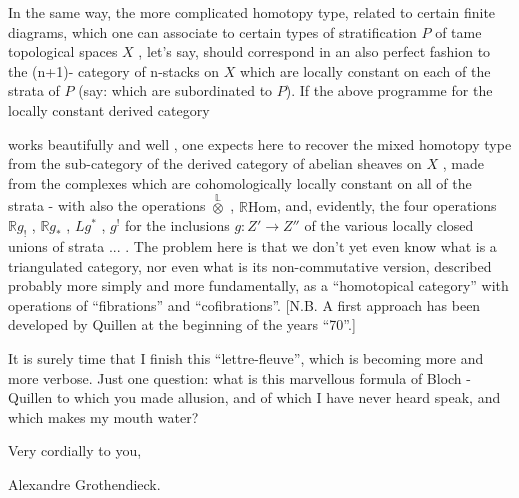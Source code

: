 \documentclass[11pt]{article}
\newcommand{\scanpage}[1]{\par\bigskip\noindent{\small\sffamily[scan #1]}\par}
\newcommand{\mspage}[1]{{\small\sffamily[p.\,#1]}}
\newcommand{\hand}[1]{\textcolor{blue}{#1}}
\begin{document}
In the same way, the more complicated homotopy type, related
to certain finite diagrams, which one can associate to certain
types of stratification $P$ of tame topological spaces $X$ , let's
say, should correspond in an also perfect fashion to the (n+1)-%
category of n-stacks on $X$ which are locally constant on each
of the strata of $P$ (say: which are subordinated to $P$).
If the above programme for the locally constant derived category

\mspage{\hand{143}}

\clearpage
\scanpage{134-2/143}
\mspage{- 16 -}

works beautifully and well , one expects here to recover the
mixed homotopy type from the sub-category  of the derived category
of abelian sheaves on  $X$ , made from the complexes which are
cohomologically locally constant on all of  the strata - with
also the operations $\overset{\mathbb{L}}{\otimes}$ , $\mathbb{R}\mathrm{Hom}$, and, evidently, the four operations
$\mathbb{R}g_!$ , $\mathbb{R}g_*$ , $Lg^*$ , $g^!$  for the inclusions  $g : Z' \to Z''$ of the
various locally closed unions of strata ... .  The problem here
is that we don't yet even know what is a triangulated category,
nor even what is its non-commutative version, described probably
more simply and more fundamentally, as a ``homotopical category''
with operations of ``fibrations'' and ``cofibrations''.  [N.B. A
first approach has been developed by Quillen at the beginning
of the years ``70''.]

It is surely time that I finish this ``lettre-fleuve'', which
is becoming more and more verbose.  Just one question: what is
this marvellous formula of Bloch - Quillen to which you made
allusion, and of which I have never heard speak, and which makes
my mouth water?

Very cordially to you,

Alexandre  Grothendieck.

\mspage{\hand{144}}
\end{document}
